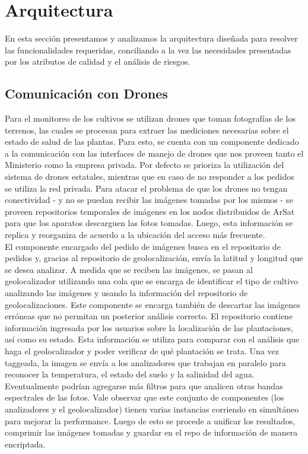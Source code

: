 \section{Arquitectura}

En esta sección presentamos y analizamos la arquitectura diseñada para resolver las funcionalidades requeridas, conciliando a la vez las necesidades presentadas por los atributos de calidad y el análisis de riesgos.

\subsection{Comunicación con Drones}

Para el monitoreo de los cultivos se utilizan drones que toman fotografías de los terrenos, las cuales se procesan para extraer las mediciones necesarias sobre el estado de salud de las plantas.  Para esto, se cuenta con un componente dedicado a la comunicación con las interfaces de manejo de drones que nos proveen tanto el Ministerio como la empresa privada. Por defecto se prioriza la utilización del sistema de drones estatales, mientras que en caso de no responder a los pedidos se utiliza la red privada. Para atacar el problema de que los drones no tengan conectividad - y no se puedan recibir las imágenes tomadas por los mismos - se proveen repositorios temporales de imágenes en los nodos distribuidos de ArSat para que los aparatos descarguen las fotos tomadas. Luego, esta información se replica y reorganiza de acuerdo a la ubicación del acceso más frecuente.\\
\indent El componente encargado del pedido de imágenes busca en el repositorio de pedidos y, gracias al repositorio de geolocalización, envía la latitud y longitud que se desea analizar. A medida que se reciben las imágenes, se pasan al geolocalizador utilizando una cola que se encarga de identificar el tipo de cultivo analizando las imágenes y usando la información del repositorio de geolocalizaciones. Este componente se encarga también de descartar las imágenes erróneas que no permitan un posterior análisis correcto. El repositorio contiene información ingresada por los usuarios sobre la localización de las plantaciones, así como su estado. Esta información se utiliza para comparar con el análisis que haga el geolocalizador y poder verificar de qué plantación se trata. Una vez taggeada, la imagen se envía a los analizadores que trabajan en paralelo para reconocer la temperatura, el estado del suelo y la salinidad del agua. Eventualmente podrían agregarse más filtros para que analicen otras bandas espectrales de las fotos. Vale observar que este conjunto de componentes (los analizadores y el geolocalizador) tienen varias instancias corriendo en simultáneo para mejorar la performance. Luego de esto se procede a unificar los resultados, comprimir las imágenes tomadas y guardar en el repo de información de manera encriptada.\\

